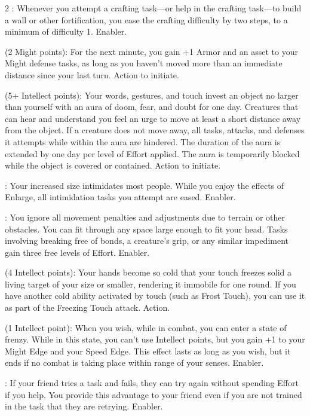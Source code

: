 \begin{multicols}{2}
: Whenever you attempt a crafting task—or help in the crafting task—to build a wall or other fortification, you ease the crafting difficulty by two steps, to a minimum of difficulty 1. Enabler.
 
 (2 Might points): For the next minute, you gain +1 Armor and an asset to your Might defense tasks, as long as you haven’t moved more than an immediate distance since your last turn. Action to initiate. 
 
 (5+ Intellect points): Your words, gestures, and touch invest an object no larger than yourself with an aura of doom, fear, and doubt for one day. Creatures that can hear and understand you feel an urge to move at least a short distance away from the object. If a creature does not move away, all tasks, attacks, and defenses it attempts while within the aura are hindered. The duration of the aura is extended by one day per level of Effort applied. The aura is temporarily blocked while the object is covered or contained. Action to initiate. 
 
: Your increased size intimidates most people. While you enjoy the effects of Enlarge, all intimidation tasks you attempt are eased. Enabler. 
 
: You ignore all movement penalties and adjustments due to terrain or other obstacles. You can fit through any space large enough to fit your head. Tasks involving breaking free of bonds, a creature’s grip, or any similar impediment gain three free levels of Effort. Enabler.
 
 (4 Intellect points): Your hands become so cold that your touch freezes solid a living target of your size or smaller, rendering it immobile for one round. If you have another cold ability activated by touch (such as Frost Touch), you can use it as part of the Freezing Touch attack. Action. 
 
 (1 Intellect point): When you wish, while in combat, you can enter a state of frenzy. While in this state, you can’t use Intellect points, but you gain +1 to your Might Edge and your Speed Edge. This effect lasts as long as you wish, but it ends if no combat is taking place within range of your senses. Enabler. 
 
: If your friend tries a task and fails, they can try again without spending Effort if you help. You provide this advantage to your friend even if you are not trained in the task that they are retrying. Enabler. 
 

\end{multicols}
